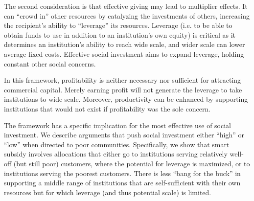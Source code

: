 \documentclass[letterpaper, 12pt]{article}
\begin{document}
The second consideration is that effective giving may lead to multiplier
effects. It can ``crowd in'' other resources by catalyzing the
investments of others, increasing the recipient's ability to
``leverage'' its resources. Leverage (i.e. to be able to obtain funds to
use in addition to an institution's own equity) is critical as it
determines an institution's ability to reach wide scale, and wider scale
can lower average fixed costs. Effective social investment aims to
expand leverage, holding constant other social concerns.

In this framework, profitability is neither necessary nor sufficient for
attracting commercial capital. Merely earning profit will not generate
the leverage to take institutions to wide scale. Moreover, productivity
can be enhanced by supporting institutions that would not exist if
profitability was the sole concern.

The framework has a specific implication for the most effective use of
social investment. We describe arguments that push social investment
either ``high'' or ``low'' when directed to poor communities.
Specifically, we show that smart subsidy involves allocations that
either go to institutions serving relatively well-off (but still poor)
customers, where the potential for leverage is maximized, or to
institutions serving the poorest customers. There is less ``bang for the
buck'' in supporting a middle range of institutions that are
self-sufficient with their own resources but for which leverage (and
thus potential scale) is limited.



\newpage

\printbibliography
\end{document}
